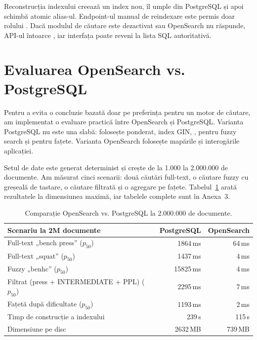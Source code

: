 Reconstrucția indexului creează un index nou, îl umple din PostgreSQL și apoi schimbă atomic alias-ul.
Endpoint-ul manual de reindexare este permis doar rolului . Dacă modulul de căutare este
dezactivat sau OpenSearch nu răspunde, API-ul întoarce , iar interfața poate reveni la lista
SQL autoritativă.

\section{Evaluarea OpenSearch vs. PostgreSQL}
\label{sec:benchmark}

Pentru a evita o concluzie bazată doar pe preferința pentru un motor de căutare, am implementat o
evaluare practică între OpenSearch și PostgreSQL. Varianta PostgreSQL nu este una slabă: folosește
 ponderat, index GIN, ,  pentru fuzzy search și
 pentru fațete. Varianta OpenSearch folosește mapările și interogările aplicației.

Setul de date este generat determinist și crește de la 1.000 la 2.000.000 de documente. Am măsurat
cinci scenarii: două căutări full-text, o căutare fuzzy cu greșeală de tastare, o căutare filtrată și
o agregare pe fațete. Tabelul~\ref{tab:bench} arată rezultatele la dimensiunea maximă, iar tabelele
complete sunt în Anexa~3.

\begin{table}[!htb]
  \centering
  \begin{tabular}{@{}lrr@{}}
  \toprule
  Scenariu la 2M documente & PostgreSQL & OpenSearch \\
  \midrule
  Full-text „bench press” ($p_{50}$) & 1864\,ms & 64\,ms \\
  Full-text „squat” ($p_{50}$) & 1437\,ms & 4\,ms \\
  Fuzzy „benhc” ($p_{50}$) & 15825\,ms & 4\,ms \\
  Filtrat (press + INTERMEDIATE + PPL) ($p_{50}$) & 2295\,ms & 7\,ms \\
  Fațetă după dificultate ($p_{50}$) & 1193\,ms & 2\,ms \\
  \midrule
  Timp de construcție a indexului & 239\,s & 115\,s \\
  Dimensiune pe disc & 2632\,MB & 739\,MB \\
  \bottomrule
  \end{tabular}
  \caption{Comparație OpenSearch vs. PostgreSQL la 2.000.000 de documente.}
  \label{tab:bench}
\end{table}


